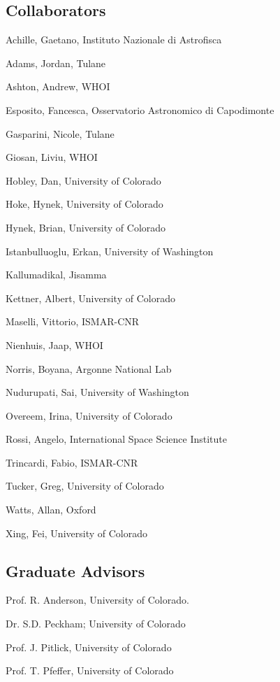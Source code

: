 \documentclass[letterpaper]{resume}
\begin{document}
\subsection{Collaborators}
\begin{multicols}{2}
\begin{compactitem}[\itembullet]

  \item Achille, Gaetano, Instituto Nazionale di Astrofisca
  \item Adams, Jordan, Tulane
  \item Ashton, Andrew,  WHOI
  \item Esposito, Fancesca, Osservatorio Astronomico di Capodimonte
  \item Gasparini, Nicole, Tulane
  \item Giosan, Liviu, WHOI
  \item Hobley, Dan,  University of Colorado
  \item Hoke, Hynek,  University of Colorado
  \item Hynek, Brian,  University of Colorado
  \item Istanbulluoglu, Erkan, University of Washington
  \item Kallumadikal, Jisamma
  \item Kettner, Albert, University of Colorado
  \item Maselli, Vittorio, ISMAR-CNR
  \item Nienhuis, Jaap, WHOI
  \item Norris, Boyana, Argonne National Lab
  \item Nudurupati, Sai, University of Washington
  \item Overeem, Irina, University of Colorado
  \item Rossi, Angelo, International Space Science Institute
  \item Trincardi, Fabio, ISMAR-CNR
  \item Tucker, Greg, University of Colorado
  \item Watts, Allan, Oxford
  \item Xing, Fei, University of Colorado
\end{compactitem}
\end{multicols}

\subsection{Graduate Advisors}
\begin{multicols}{2}
\begin{compactitem}[\itembullet]
  \item Prof. R. Anderson, University of Colorado.
  \item Dr. S.D. Peckham; University of Colorado
  \item Prof. J. Pitlick, University of Colorado
  \item Prof. T. Pfeffer, University of Colorado
\end{compactitem}
\end{multicols}
\end{document}
